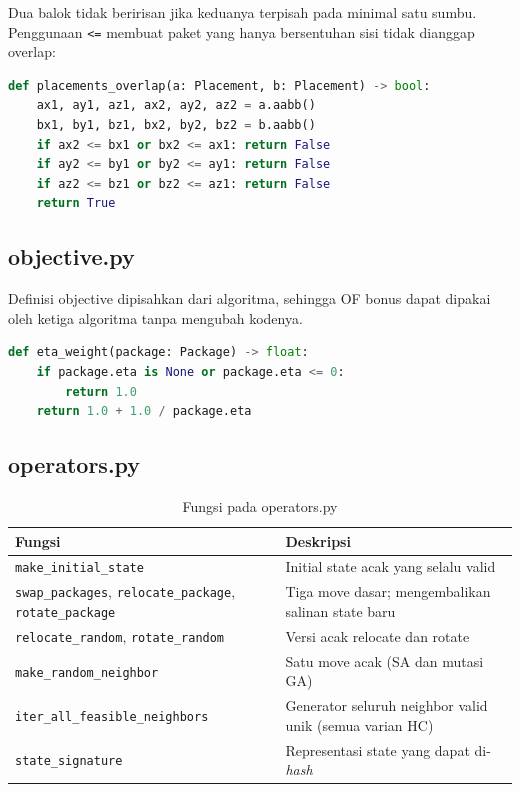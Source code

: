 \documentclass[12pt,a4paper]{report}
\newcommand{\hd}[1]{\cellcolor{hdr}\textbf{#1}}
\newcommand{\code}[1]{\texttt{\small #1}}
\begin{document}
Dua balok tidak beririsan jika keduanya terpisah pada minimal satu sumbu. Penggunaan \code{<=}
membuat paket yang hanya bersentuhan sisi tidak dianggap overlap:
\begin{lstlisting}[language=Python]
def placements_overlap(a: Placement, b: Placement) -> bool:
    ax1, ay1, az1, ax2, ay2, az2 = a.aabb()
    bx1, by1, bz1, bx2, by2, bz2 = b.aabb()
    if ax2 <= bx1 or bx2 <= ax1: return False
    if ay2 <= by1 or by2 <= ay1: return False
    if az2 <= bz1 or bz2 <= az1: return False
    return True
\end{lstlisting}

\subsection{objective.py}
Definisi objective dipisahkan dari algoritma, sehingga OF bonus dapat dipakai oleh ketiga
algoritma tanpa mengubah kodenya.
\begin{lstlisting}[language=Python]
def eta_weight(package: Package) -> float:
    if package.eta is None or package.eta <= 0:
        return 1.0
    return 1.0 + 1.0 / package.eta
\end{lstlisting}

\subsection{operators.py}
\begin{table}[H]
\centering
\caption{Fungsi pada operators.py}
\small
\begin{tabular}{|L{5.4cm}|L{7.8cm}|}
\hline
\hd{Fungsi} & \hd{Deskripsi} \\ \hline
\code{make\_initial\_state} & Initial state acak yang selalu valid \\ \hline
\code{swap\_packages}, \code{relocate\_package}, \code{rotate\_package} & Tiga move dasar; mengembalikan salinan state baru \\ \hline
\code{relocate\_random}, \code{rotate\_random} & Versi acak relocate dan rotate \\ \hline
\code{make\_random\_neighbor} & Satu move acak (SA dan mutasi GA) \\ \hline
\code{iter\_all\_feasible\_neighbors} & Generator seluruh neighbor valid unik (semua varian HC) \\ \hline
\code{state\_signature} & Representasi state yang dapat di-\textit{hash} \\ \hline
\end{tabular}
\end{table}
\end{document}
